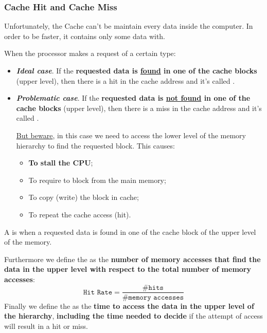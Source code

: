 \subsubsection{Cache Hit and Cache Miss}

Unfortunately, the Cache can't be maintain every data inside the computer. In order to be faster, it contains only some data with.

\highspace
When the processor makes a request of a certain type:
\begin{itemize}
    \item \textcolor{Green3}{\textbf{\emph{Ideal case}}}. If the \textbf{requested data is \underline{found} in one of the cache blocks} (upper level), then there is a hit in the cache address and it's called .

    \item \textcolor{Red2}{\textbf{\emph{Problematic case}}}. If the \textbf{requested data is \underline{not found} in one of the cache blocks} (upper level), then there is a miss in the cache address and it's called .

    \underline{But beware}, in this case we need to access the lower level of the memory hierarchy to find the requested block. This causes:
    \begin{itemize}
        \item \textbf{To stall the CPU};
        \item To require to block from the main memory;
        \item To copy (write) the block in cache;
        \item To repeat the cache access (hit).
    \end{itemize}
\end{itemize}

\begin{definitionbox}
    A  is when a requested data is found in one of the cache block of the upper level of the memory.
\end{definitionbox}

\noindent
Furthermore we define the  as the \textbf{number of memory accesses that find the data in the upper level with respect to the total number of memory accesses}:
\begin{equation*}
    \texttt{Hit Rate} = \dfrac{\texttt{\# hits}}{\texttt{\# memory accesses}}
\end{equation*}
Finally we define the  as the \textbf{time to access the data in the upper level of the hierarchy}, \textbf{including the time needed to decide} if the attempt of access will result in a hit or miss.



